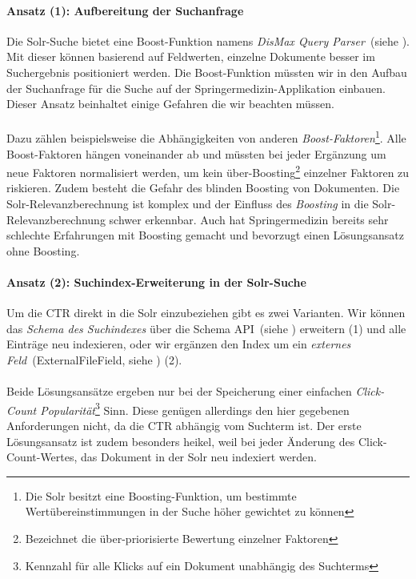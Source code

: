 \paragraph{Ansatz (1): Aufbereitung der Suchanfrage} Die Solr-Suche bietet eine Boost-Funktion namens \textit{DisMax Query Parser}~(siehe \cite{DisMax}). Mit dieser können basierend auf Feldwerten, einzelne Dokumente besser im Suchergebnis positioniert werden. Die Boost-Funktion müssten wir in den Aufbau der Suchanfrage für die Suche auf der Springermedizin-Applikation einbauen. Dieser Ansatz beinhaltet einige Gefahren die wir beachten müssen.
\\
\\
Dazu zählen beispielsweise die Abhängigkeiten von anderen \textit{Boost-Faktoren}\footnote{Die Solr besitzt eine Boosting-Funktion, um bestimmte Wertübereinstimmungen in der Suche höher gewichtet zu können}. Alle Boost-Faktoren hängen voneinander ab und müssten bei jeder Ergänzung um neue Faktoren normalisiert werden, um kein \glqq über-Boosting\grqq{}\footnote{Bezeichnet die über-priorisierte Bewertung einzelner Faktoren} einzelner Faktoren zu riskieren. Zudem besteht die Gefahr des \glqq blinden Boosting\grqq{} von Dokumenten. Die Solr-Relevanzberechnung ist komplex und der Einfluss des \textit{Boosting} in die Solr-Relevanzberechnung schwer erkennbar. Auch hat Springermedizin bereits sehr schlechte Erfahrungen mit Boosting gemacht und bevorzugt einen Lösungsansatz ohne Boosting.

\paragraph{Ansatz (2): Suchindex-Erweiterung in der Solr-Suche}
Um die CTR direkt in die Solr einzubeziehen gibt es zwei Varianten. Wir können das \textit{Schema des Suchindexes} über die Schema API~(siehe \cite{SchemaAPISolr}) erweitern (1) und alle Einträge neu indexieren, oder wir ergänzen den Index um ein \textit{externes Feld}~(ExternalFileField, siehe \cite{ExtFieldSolr}) (2).
\\
\\
Beide Lösungsansätze ergeben nur bei der Speicherung einer einfachen \textit{Click-Count Popularität}\footnote{Kennzahl für alle Klicks auf ein Dokument unabhängig des Suchterms} Sinn. Diese genügen allerdings den hier gegebenen Anforderungen nicht, da die CTR abhängig vom Suchterm ist. Der erste Lösungsansatz ist zudem besonders heikel, weil bei jeder Änderung des Click-Count-Wertes, das Dokument in der Solr neu indexiert werden.

